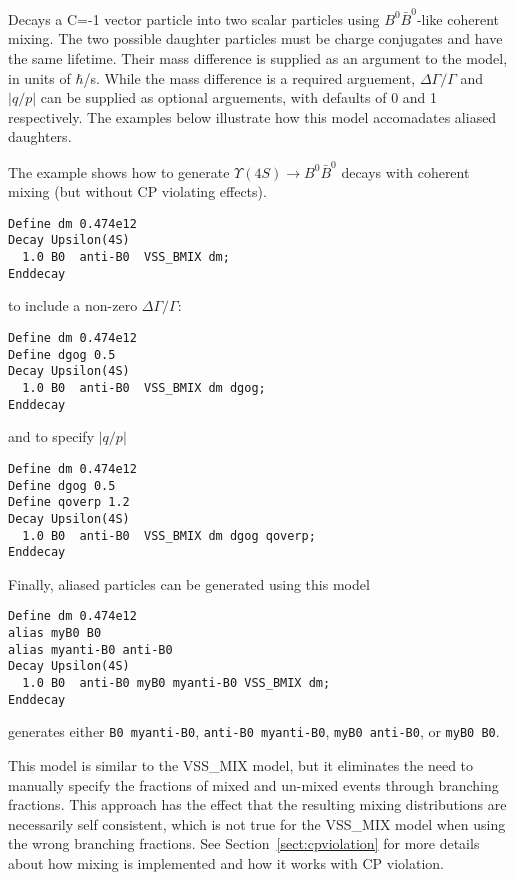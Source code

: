 
\label{vssbmix}



\Expl
Decays a C=-1 vector particle into two scalar particles using $B^0 \bar
B^0$-like coherent mixing. The two possible daughter particles must be
charge conjugates and have the same lifetime. Their mass difference is
supplied as an argument to the model, in units of $\hbar$/s.  
While the mass difference is a required arguement, $\Delta \Gamma / \Gamma$
and $\vert q/p \vert$ can be supplied as optional arguements,
with defaults of 0 and 1 respectively.  The examples below
illustrate how this model accomadates aliased daughters.

\Example
The example shows how to generate $\Upsilon(4S)\rightarrow B^0 \bar
B^0$ decays with coherent mixing (but without CP violating effects).
\begin{verbatim}
Define dm 0.474e12
Decay Upsilon(4S)
  1.0 B0  anti-B0  VSS_BMIX dm;
Enddecay
\end{verbatim}
to include a non-zero $\Delta \Gamma / \Gamma$:
\begin{verbatim}
Define dm 0.474e12
Define dgog 0.5
Decay Upsilon(4S)
  1.0 B0  anti-B0  VSS_BMIX dm dgog;
Enddecay
\end{verbatim}
and to specify $\vert q / p \vert$
\begin{verbatim}
Define dm 0.474e12
Define dgog 0.5
Define qoverp 1.2
Decay Upsilon(4S)
  1.0 B0  anti-B0  VSS_BMIX dm dgog qoverp;
Enddecay
\end{verbatim}
Finally, aliased particles can be generated using
this model
\begin{verbatim}
Define dm 0.474e12
alias myB0 B0
alias myanti-B0 anti-B0
Decay Upsilon(4S)
  1.0 B0  anti-B0 myB0 myanti-B0 VSS_BMIX dm;
Enddecay
\end{verbatim}
generates either {\tt B0 myanti-B0},
{\tt anti-B0 myanti-B0},
{\tt myB0 anti-B0}, or
{\tt myB0 B0}.

\Notes
This model is similar to the VSS\_MIX model, but it eliminates the need to
manually specify the fractions of mixed and un-mixed events through
branching fractions. This approach has the effect that the resulting mixing
distributions are necessarily self consistent, which is not true for the
VSS\_MIX model when using the wrong branching fractions.  See
Section~\ref{sect:cpviolation} for more details about how mixing is
implemented and how it works with CP violation.

